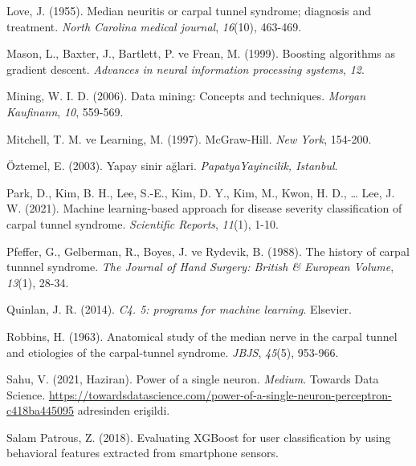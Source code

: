 \documentclass[12pt,twoside]{deuthesis}
\begin{document}
\begin{CSLReferences}{1}{0}
\leavevmode{}%
Love, J. (1955). Median neuritis or carpal tunnel syndrome; diagnosis and treatment. \emph{North Carolina medical journal}, \emph{16}(10), 463-469.

\leavevmode{}%
Mason, L., Baxter, J., Bartlett, P. ve Frean, M. (1999). Boosting algorithms as gradient descent. \emph{Advances in neural information processing systems}, \emph{12}.

\leavevmode{}%
Mining, W. I. D. (2006). Data mining: Concepts and techniques. \emph{Morgan Kaufinann}, \emph{10}, 559-569.

\leavevmode{}%
Mitchell, T. M. ve Learning, M. (1997). McGraw-Hill. \emph{New York}, 154-200.

\leavevmode{}%
Öztemel, E. (2003). Yapay sinir ağlari. \emph{PapatyaYayincilik, Istanbul}.

\leavevmode{}%
Park, D., Kim, B. H., Lee, S.-E., Kim, D. Y., Kim, M., Kwon, H. D., \ldots{} Lee, J. W. (2021). Machine learning-based approach for disease severity classification of carpal tunnel syndrome. \emph{Scientific Reports}, \emph{11}(1), 1-10.

\leavevmode{}%
Pfeffer, G., Gelberman, R., Boyes, J. ve Rydevik, B. (1988). The history of carpal tunnnel syndrome. \emph{The Journal of Hand Surgery: British \& European Volume}, \emph{13}(1), 28-34.

\leavevmode{}%
Quinlan, J. R. (2014). \emph{C4. 5: programs for machine learning}. Elsevier.

\leavevmode{}%
Robbins, H. (1963). Anatomical study of the median nerve in the carpal tunnel and etiologies of the carpal-tunnel syndrome. \emph{JBJS}, \emph{45}(5), 953-966.

\leavevmode{}%
Sahu, V. (2021, Haziran). Power of a single neuron. \emph{Medium}. Towards Data Science. \url{https://towardsdatascience.com/power-of-a-single-neuron-perceptron-c418ba445095} adresinden erişildi.

\leavevmode{}%
Salam Patrous, Z. (2018). Evaluating XGBoost for user classification by using behavioral features extracted from smartphone sensors.


\end{CSLReferences}
\end{document}
